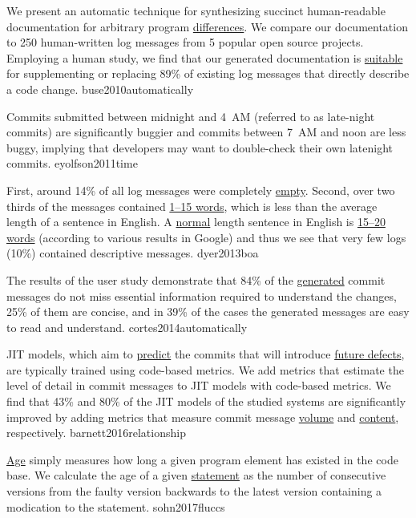 \documentclass{article}
\begin{document}
  {We present an automatic technique for synthesizing succinct human-readable documentation for arbitrary program \ul{differences}. We compare our documentation to 250 human-written log messages from 5 popular open source projects. Employing a human study, we find that our generated documentation is \ul{suitable} for supplementing or replacing 89\% of existing log messages that directly describe a code change.}
  {buse2010automatically}

  {Commits submitted between midnight and 4~AM (referred to as late-night commits) are significantly buggier and commits between 7~AM and noon are less buggy, implying that developers may want to double-check their own latenight commits.}
  {eyolfson2011time}

  {First, around 14\% of all log messages were completely \ul{empty}. Second, over two thirds of the messages contained \ul{1–15 words}, which is less than the average length of a sentence in English. A \ul{normal} length sentence in English is \ul{15–20 words} (according to various results in Google) and thus we see that very few logs (10\%) contained descriptive messages.}
  {dyer2013boa}

  {The results of the user study demonstrate that 84\% of the \ul{generated} commit messages do not miss essential information required to understand the changes, 25\% of them are concise, and in 39\% of the cases the generated messages are easy to read and understand.}
  {cortes2014automatically}

  {JIT models, which aim to \ul{predict} the commits that will introduce \ul{future defects}, are typically trained using code-based metrics. We add metrics that estimate the level of detail in commit messages to JIT models with code-based metrics. We find that 43\% and 80\% of the JIT models of the studied systems are significantly improved by adding metrics that measure commit message \ul{volume} and \ul{content}, respectively.}
  {barnett2016relationship}

  {\ul{Age} simply measures how long a given program element has existed in the code base. We calculate the age of a given \ul{statement} as the number of consecutive versions from the faulty version backwards to the latest version containing a modication to the statement.}
  {sohn2017fluccs}
\end{document}

